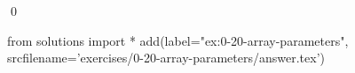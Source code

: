 
\begin{ex}
  \label{ex:0-20-array-parameters}
  
  \qed
\end{ex}
\begin{python0}
from solutions import *
add(label="ex:0-20-array-parameters",
    srcfilename='exercises/0-20-array-parameters/answer.tex')
\end{python0}
